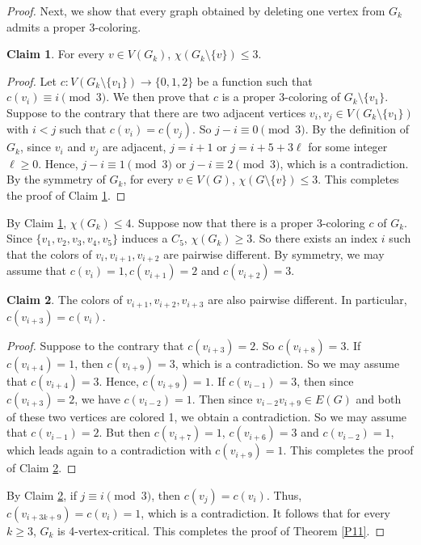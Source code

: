 \documentclass[11pt,a4paper]{article}
\theoremstyle{definition}
\newtheorem{claim}{\indent Claim}
\begin{document}
\begin{proof}
    Next, we show that every graph obtained by deleting one vertex from $G_k$ admits a proper 3-coloring. 
    \begin{claim}\label{claim:critical of G_k}
        For every $v\in V(G_k)$, $\chi(G_k\setminus \{v\})\leq 3$. 
    \end{claim}
    \begin{proof}
        Let $c: V(G_k\setminus \{v_1\}) \to \{0,1,2\}$ be a function such that $c(v_i)\equiv i\pmod{3}$. 
        We then prove that $c$ is a proper 3-coloring of $G_k\setminus \{v_1\}$. 
        Suppose to the contrary that there are two adjacent vertices $v_i,v_j\in V(G_k\setminus \{v_1\})$ with $i<j$ such that $c(v_i)=c(v_j)$.
        So $j-i \equiv 0\pmod{3}$. 
        By the definition of $G_k$, since $v_i$ and $v_j$ are adjacent, $j=i+1$ or $j=i+5+3\ell$ for some integer $\ell \geq 0$. 
        Hence, $j-i \equiv 1\pmod{3}$ or $j-i \equiv 2\pmod{3}$, which is a contradiction. 
        By the symmetry of $G_k$, for every $v\in V(G)$, $\chi(G\setminus \{v\})\leq 3$. 
        This completes the proof of Claim \ref{claim:critical of G_k}.
    \end{proof}
    By Claim \ref{claim:critical of G_k}, $\chi(G_k)\leq 4$. 
    Suppose now that there is a proper 3-coloring $c$ of $G_k$. 
	Since $\{v_1,v_2,v_3,v_4,v_5\}$ induces a $C_5$, $\chi(G_k)\geq 3$. 
	So there exists an index $i$ such that the colors of $v_i,v_{i+1},v_{i+2}$ are pairwise different. 
	By symmetry, we may assume that $c(v_i)=1,c(v_{i+1})=2$ and $c(v_{i+2})=3$. 
    \begin{claim}\label{claim:3-coloring contradict}
        The colors of $v_{i+1},v_{i+2},v_{i+3}$ are also pairwise different. 
        In particular, $c(v_{i+3})=c(v_i)$.
    \end{claim}
   \begin{proof}
       Suppose to the contrary that $c(v_{i+3})=2$. 
       So $c(v_{i+8})=3$. 
       If $c(v_{i+4})=1$, then $c(v_{i+9})=3$, which is a contradiction. 
       So we may assume that $c(v_{i+4})=3$. 
       Hence, $c(v_{i+9})=1$.  
       If $c(v_{i-1})=3$, then since $c(v_{i+3})=2$, we have $c(v_{i-2})=1$. 
       Then since $v_{i-2}v_{i+9}\in E(G)$ and both of these two vertices are colored 1, we obtain a contradiction.  
       So we may assume that $c(v_{i-1})=2$. But then $c(v_{i+7})=1$, $c(v_{i+6})=3$ and $c(v_{i-2})=1$, which leads again to a contradiction with $c(v_{i+9})=1$. 
       This completes the proof of Claim \ref{claim:3-coloring contradict}.
   \end{proof}
		
	By Claim \ref{claim:3-coloring contradict}, if $j\equiv i\pmod{3}$, then $c(v_j)=c(v_i)$. 
    Thus, $c(v_{i+3k+9})=c(v_{i})=1$, which is a contradiction. 
    It follows that for every $k\geq 3$, $G_k$ is 4-vertex-critical. 
    This completes the proof of Theorem \ref{P11}.
\end{proof}
\end{document}

